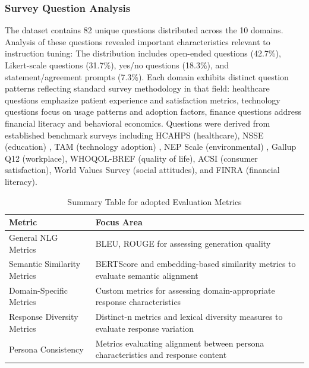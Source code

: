 \documentclass[11pt]{article}
\begin{document}
\subsubsection{Survey Question Analysis}
The dataset contains 82 unique questions distributed across the 10 domains. Analysis of these questions revealed important characteristics relevant to instruction tuning: The distribution includes open-ended questions (42.7\%), Likert-scale questions (31.7\%), yes/no questions (18.3\%), and statement/agreement prompts (7.3\%). Each domain exhibits distinct question patterns reflecting standard survey methodology in that field: healthcare questions emphasize patient experience and satisfaction metrics, technology questions focus on usage patterns and adoption factors, finance questions address financial literacy and behavioral economics. Questions were derived from established benchmark surveys including HCAHPS (healthcare)\citep{HCAHPS_CMS_2022}, NSSE (education) \citep{NSSE_IndianaUniversity_2024}, TAM (technology adoption) \citep{TAM_Davis_1989}, NEP Scale (environmental) \citep{NEP_Dunlap_2000}, Gallup Q12 (workplace)\citep{GallupQ12_Buckingham_Coffman_1999}, WHOQOL-BREF (quality of life)\citep{WHOQOL_BREF_WHO_1998}, ACSI (consumer satisfaction)\citep{ACSI_Fornell_1996}, World Values Survey (social attitudes)\citep{WVS_WorldValuesSurveyAssociation_2022}, and FINRA (financial literacy)\citep{FINRA_FINRAFoundation_2021}.
\begin{table}[ht]
  \centering
  \begin{tabular}{|p{3cm}|p{5cm}|}
    \hline
    \textbf{Metric}& \textbf{Focus Area}\\
    \hline
    General NLG Metrics& BLEU, ROUGE for assessing generation quality\\
    \hline
    Semantic Similarity Metrics& BERTScore and embedding-based similarity metrics to evaluate semantic alignment\\
    \hline
    Domain-Specific Metrics& Custom metrics for assessing domain-appropriate response characteristics\\
    \hline
    Response Diversity Metrics& Distinct-n metrics and lexical diversity measures to evaluate response variation\\
    \hline
 Persona Consistency& Metrics evaluating alignment between persona characteristics and response content\\\hline
  \end{tabular}
  \caption{Summary Table for adopted Evaluation Metrics}
\end{table}
\end{document}
